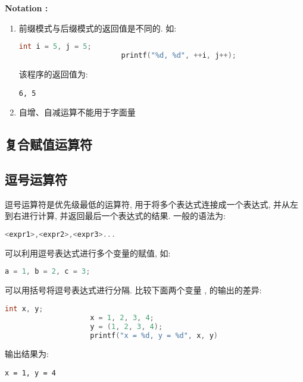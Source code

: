         \textbf{Notation :}
            \begin{enumerate}
                \item 前缀模式与后缀模式的返回值是不同的.  如:
                    \begin{lstlisting}[language = {C}, gobble = 24]
                        int i = 5, j = 5;
                        printf("%d, %d", ++i, j++);
                    \end{lstlisting}
                    该程序的返回值为:
                    \begin{lstlisting}[gobble = 24]
                        6, 5
                    \end{lstlisting}
                \item 自增、自减运算不能用于字面量
            \end{enumerate}
    \subsection{复合赋值运算符}

    \subsection{逗号运算符}
        \hspace*{2em} 逗号运算符是优先级最低的运算符, 用于将多个表达式连接成一个表达式, 并从左到右进行计算, 并返回最后一个表达式的结果. 一般的语法为:
            \begin{lstlisting}[language = {C}, gobble = 16]
                <expr1>,<expr2>,<expr3>...
            \end{lstlisting}

        \begin{Notation}
            \item 可以利用逗号表达式进行多个变量的赋值, 如:
                \begin{lstlisting}[language = {C}, gobble = 20]
                    a = 1, b = 2, c = 3;
                \end{lstlisting}
        \end{Notation}

        \begin{Example}[逗号表达式]
            可以用括号将逗号表达式进行分隔. 比较下面两个变量 ,  的输出的差异:
                \begin{lstlisting}[language = {C}, gobble = 20]
                    int x, y;
                    x = 1, 2, 3, 4;
                    y = (1, 2, 3, 4);
                    printf("x = %d, y = %d", x, y)
                \end{lstlisting}
            输出结果为:
                \begin{lstlisting}[gobble = 20]
                    x = 1, y = 4
                \end{lstlisting}
        \end{Example}

